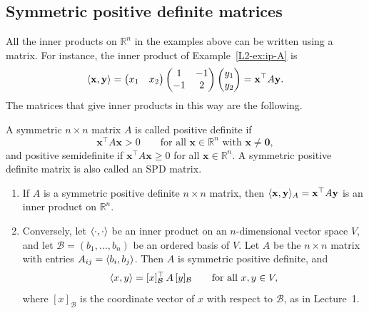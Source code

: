\subsection{Symmetric positive definite matrices}

All the inner products on $\mathbb{R}^n$ in the examples above can be written using a matrix. For instance, the inner product of Example~\ref{L2-ex:ip-A} is
\[\langle \mathbf{x}, \mathbf{y} \rangle = \begin{pmatrix} x_1 & x_2 \end{pmatrix} \begin{pmatrix} 1 & -1 \\ -1 & 2 \end{pmatrix} \begin{pmatrix} y_1 \\ y_2 \end{pmatrix} = \mathbf{x}^\top A \mathbf{y}.\]
The matrices that give inner products in this way are the following.

\begin{definition}\label{L2-def:spd}
    A symmetric $n \times n$ matrix $A$ is called positive definite if
    \[\mathbf{x}^\top A \mathbf{x} > 0 \qquad \text{for all } \mathbf{x} \in \mathbb{R}^n \text{ with } \mathbf{x} \neq \mathbf{0},\]
    and positive semidefinite if $\mathbf{x}^\top A \mathbf{x} \geq 0$ for all $\mathbf{x} \in \mathbb{R}^n$. A symmetric positive definite matrix is also called an SPD matrix.
\end{definition}

\begin{theorem}\label{L2-thm:spd}
    \begin{enumerate}
        \item If $A$ is a symmetric positive definite $n \times n$ matrix, then $\langle \mathbf{x}, \mathbf{y} \rangle_A = \mathbf{x}^\top A \mathbf{y}$ is an inner product on $\mathbb{R}^n$.
        \item Conversely, let $\langle \cdot, \cdot \rangle$ be an inner product on an $n$-dimensional vector space $V$, and let $\mathcal{B} = (b_1, \ldots, b_n)$ be an ordered basis of $V$. Let $A$ be the $n \times n$ matrix with entries $A_{ij} = \langle b_i, b_j \rangle$. Then $A$ is symmetric positive definite, and
        \[\langle x, y \rangle = [x]_{\mathcal{B}}^\top \, A \, [y]_{\mathcal{B}} \qquad \text{for all } x, y \in V,\]
        where $[x]_{\mathcal{B}}$ is the coordinate vector of $x$ with respect to $\mathcal{B}$, as in Lecture~1.
    \end{enumerate}
\end{theorem}

